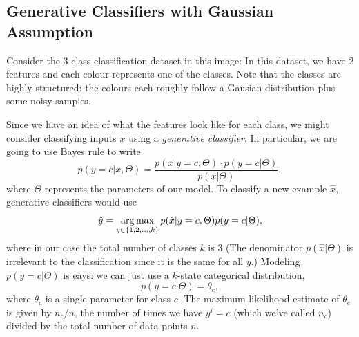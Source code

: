\documentclass{article}
\begin{document}
\newpage
\subsection{Generative Classifiers with Gaussian Assumption}

Consider the 3-class classification dataset in this image:
In this dataset, we have 2 features and each colour represents one of the classes. Note that the classes are highly-structured: the colours each roughly follow a Gausian distribution plus some noisy samples.

Since we have an idea of what the features look like for each class, we might consider classifying  inputs $x$ using a \emph{generative classifier}. In particular, we are going to use Bayes rule to write
\[
p(y=c|x,\Theta) = \frac{p(x| y=c, \Theta) \cdot p(y=c|\Theta)}{p(x|\Theta)},
\]
where $\Theta$ represents the parameters of our model. To classify a new example $\hat{x}$, generative classifiers would use
\[
\hat{y} = \mathop{\rm arg\,max}_{y \in \{1,2,\dots,k\}} p(\hat{x}| y=c,\Theta)p(y=c|\Theta),
\]
where in our case the total number of classes $k$ is $3$ (The denominator $p(\hat{x}|\Theta)$ is irrelevant to the classification since it is the same for all $y$.)
Modeling $p(y=c|\Theta)$ is eays: we can just use a $k$-state categorical distribution,
\[
p(y = c | \Theta) = \theta_c,
\]
where $\theta_c$ is a single parameter for class $c$. The maximum likelihood estimate of $\theta_c$ is given by $n_c/n$, the number of times we have $y^i = c$ (which we've called $n_c$) divided by the total number of data points $n$.
\end{document}
